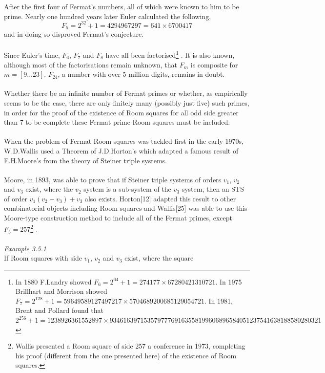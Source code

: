\documentclass[
  12pt,
  a4paper]{book}
\begin{document}
After the first four of Fermat's numbers, all of which were known to him
to be prime. Nearly one hundred years later Euler calculated the
following, \[F_5 = 2^{32}+1=4294967297=641\times 6700417\] and in doing
so disproved Fermat's conjecture.\\
~\\
Since Euler's time, \(F_6\), \(F_7\) and \(F_8\) have all been factorised\footnote{In 1880 F.Landry showed
  \(F_6=2^{64}+1=274177 \times 67280421310721\). In 1975 Brillhart and
  Morrison showed
  \(F_7=2^{128}+1=59649589127497217 \times 5704689200685129054721\). In
  1981, Brent and Pollard found that\\
  \(2^{256}+1=1238926361552897 \times 93461639715357977769163558199606896584051237541638188580280321\)}
. It is also known, although most of the factorisations remain unknown,
that \(F_m\) is composite for \(m=[9...23]\). \(F_{24}\), a number with over 5
million digits, remains in doubt.\\
~\\
Whether there be an infinite number of Fermat primes or whether, as
empirically seems to be the case, there are only finitely many (possibly
just five) such primes, in order for the proof of the existence of Room
squares for all odd side greater than 7 to be complete these Fermat
prime Room squares must be included.\\
~\\
When the problem of Fermat Room squares was tackled first in the early
1970s, W.D.Wallis used a Theorem of J.D.Horton's which adapted a famous
result of E.H.Moore's from the theory of Steiner triple systems.\\
~\\
Moore, in 1893, was able to prove that if Steiner triple systems of
orders \(v_1\), \(v_2\) and \(v_3\) exist, where the \(v_2\) system is a
sub-system of the \(v_3\) system, then an STS of order \(v_1(v_2-v_3)+v_3\)
also exists. Horton{[}12{]} adapted this result to other combinatorial
objects including Room squares and Wallis{[}25{]} was able to use this
Moore-type construction method to include all of the Fermat primes,
except \(F_3=257\)\footnote{Wallis presented a Room square of side 257 a conference in 1973,
  completing his proof (different from the one presented here) of the
  existence of Room squares.} .\\
~\\
\emph{Example 3.5.1}\\
If Room squares with side \(v_1\), \(v_2\) and \(v_3\) exist, where the square
\end{document}
